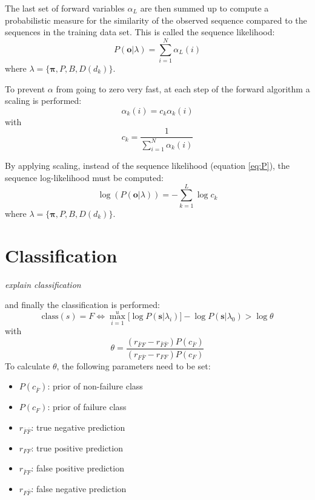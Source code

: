 \documentclass[mscthesis]{usiinfthesis}
\begin{document}
The last set of forward variables $ \alpha_L $ are then summed up to compute
a probabilistic measure for the similarity of the observed sequence compared to
the sequences in the training data set. This is called the sequence likelihood:
\begin{equation}
    \label{eq:P}
    P(\boldsymbol{o}|\lambda) = \sum\limits_{i=1}^{N} \alpha_L(i)
\end{equation}
where $ \lambda = \{\boldsymbol{\pi}, P, B, D(d_k) \} $.

To prevent $ \alpha $ from going to zero very fast, at each step of the forward
algorithm a scaling is performed:
\begin{equation}
    \alpha_k(i) = c_k \alpha_k(i)
\end{equation}
with
\begin{equation}
    c_k = \frac{1}{\sum\limits_{i=1}^{N} \alpha_k(i)}
\end{equation}

By applying scaling, instead of the sequence likelihood (equation \ref{eq:P}),
the sequence log-likelihood must be computed:
\begin{equation}
    \label{eq:Plog}
    \log(P(\boldsymbol{o}|\lambda)) = -\sum\limits_{k=1}^{L} \log c_k
\end{equation}
where $ \lambda = \{\boldsymbol{\pi}, P, B, D(d_k) \} $.

\section{Classification}
\label{ch:event_class}

\emph{\color{red}explain classification}

and finally the
classification is performed:
\begin{equation}
    \label{eq:class}
    \text{class}(s) = F \iff \max_{i=1}^{u} \big [
        \log P(\boldsymbol{s}|\lambda_i)
    \big ] - \log P(\boldsymbol{s}|\lambda_0) > \log \theta
\end{equation}
with
\begin{equation}
    \label{eq:class_thresh}
    \theta = \frac{(r_{\bar{F}F} - r_{\bar{F}\bar{F}})P(c_{\bar{F}})}
        {(r_{F \bar{F}} - r_{FF})P(c_{F})}
\end{equation}
To calculate $ \theta $, the following parameters need to be set:
\begin{itemize}
    \item $ P(c_{\bar{F}}) $: prior of non-failure class
    \item $ P(c_F) $: prior of failure class
    \item $ r_{\bar{F}\bar{F}} $: true negative prediction
    \item $ r_{FF} $: true positive prediction
    \item $ r_{\bar{F}F} $: false positive prediction
    \item $ r_{F\bar{F}} $: false negative prediction
\end{itemize}
\end{document}
